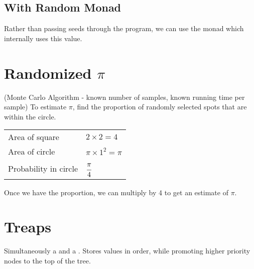 \documentclass{report}
\begin{document}
\subsection*{With Random Monad}
Rather than passing  seeds through the program, we can use the  monad which internally uses this value.


\section*{Randomized $\pi$}
(Monte Carlo Algorithm - known number of samples, known running time per sample) To estimate $\pi$, find the proportion of randomly selected spots that are within the circle.
\begin{center}
	\begin{tabular}{l l}
		Area of square        & $2 \times 2 = 4$       \\
		Area of circle        & $\pi \times 1^2 = \pi$ \\
		Probability in circle & $\cfrac{\pi}{4}$       \\
	\end{tabular}
\end{center}
Once we have the proportion, we can multiply by 4 to get an estimate of $\pi$.

\section*{Treaps}
Simultaneously a  and a . Stores values in order, while promoting higher priority nodes to the top of the tree.
\end{document}
